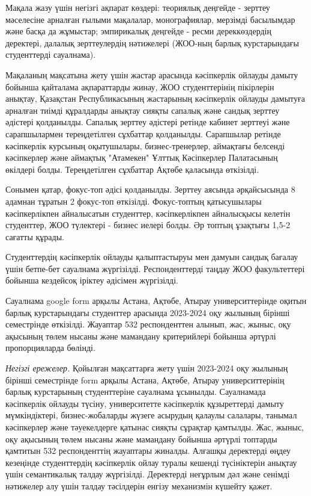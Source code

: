 \begin{multicols}{2}
Мақала жазу үшін негізгі ақпарат көздері: теориялық деңгейде - зерттеу
мәселесіне арналған ғылыми мақалалар, монографиялар, мерзімді басылымдар
және басқа да жұмыстар; эмпирикалық деңгейде - ресми дереккөздердің
деректері, далалық зерттеулердің нәтижелері (ЖОО-ның барлық
курстарындағы студенттерді сауалнама).

Мақаланың мақсатына жету үшін жастар арасында кәсіпкерлік ойлауды дамыту
бойынша қайталама ақпараттарды жинау, ЖОО студенттерінің пікірлерін
анықтау, Қазақстан Республикасының жастарының кәсіпкерлік ойлауды
дамытуға арналған тиімді құралдарды анықтау сияқты сапалық және сандық
зерттеу әдістері қолданылды. Сапалық зерттеу әдістері ретінде кабинет
зерттеуі және сарапшылармен тереңдетілген сұхбаттар қолданылды.
Сарапшылар ретінде кәсіпкерлік курсының оқытушылары, бизнес-тренерлер,
аймақтағы белсенді кәсіпкерлер және аймақтық "Атамекен" Ұлттық
Кәсіпкерлер Палатасының өкілдері болды. Тереңдетілген сұхбаттар Ақтөбе
қаласында өткізілді.

Сонымен қатар, фокус-топ әдісі қолданылды. Зерттеу аясында әрқайсысында
8 адамнан тұратын 2 фокус-топ өткізілді. Фокус-топтың қатысушылары
кәсіпкерлікпен айналысатын студенттер, кәсіпкерлікпен айналысқысы
келетін студенттер, ЖОО түлектері - бизнес иелері болды. Әр топтың
ұзақтығы 1,5-2 сағатты құрады.

Студенттердің кәсіпкерлік ойлауды қалыптастыруы мен дамуын сандық
бағалау үшін бетпе-бет сауалнама жүргізілді. Респонденттерді таңдау ЖОО
факультеттері бойынша кездейсоқ іріктеу әдісімен жүргізілді.

Сауалнама google form арқылы Астана, Ақтөбе, Атырау университтерінде
оқитын барлық курстарындағы студенттер арасында 2023-2024 оқу жылының
бірінші семестрінде өткізілді. Жауаптар 532 респонденттен алынып, жас,
жыныс, оқу ақысының төлем нысаны және мамандану критерийлері бойынша
әртүрлі пропорцияларда бөлінді.

\emph{Негізгі ережелер.} Қойылған мақсаттарға жету үшін 2023-2024 оқу
жылының бірінші семестрінде form арқылы Астана, Ақтөбе, Атырау
университтерінің барлық курстарының студенттеріне сауалнама ұсынылды.
Сауалнамада кәсіпкерлік ойлауды түсіну, университетте кәсіпкерлік
құзыреттерді дамыту мүмкіндіктері, бизнес-жобаларды жүзеге асырудың
қалаулы салалары, танымал кәсіпкерлер және тәуекелдерге қатынас сияқты
сұрақтар қамтылды. Жас, жыныс, оқу ақысының төлем нысаны және мамандану
бойынша әртүрлі топтарды қамтитын 532 респонденттің жауаптары жиналды.
Алғашқы деректерді өңдеу кезеңінде студенттердің кәсіпкерлік ойлау
туралы кешенді түсініктерін анықтау үшін семантикалық талдау жүргізілді.
Деректерді неғұрлым дәл және сенімді нәтижелер алу үшін талдау
тәсілдерін енгізу механизмін күшейту қажет.


\end{multicols}
